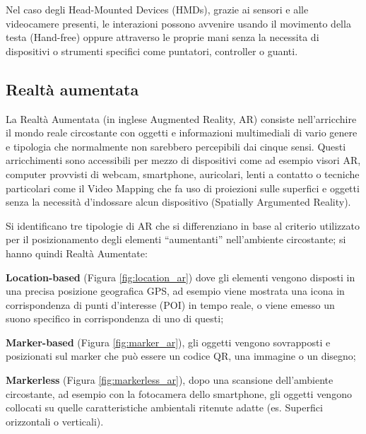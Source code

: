 Nel caso degli Head-Mounted Devices (HMDs), grazie ai sensori e alle videocamere presenti, le interazioni possono avvenire usando il movimento della testa (Hand-free) oppure attraverso le proprie mani senza la necessita di dispositivi o strumenti specifici come puntatori, controller o guanti.

\subsection{Realtà aumentata}
La Realtà Aumentata (in inglese Augmented Reality, AR) consiste nell'arricchire il mondo reale circostante con oggetti e informazioni multimediali di vario genere e tipologia che normalmente non sarebbero percepibili dai cinque sensi.
Questi arricchimenti sono accessibili per mezzo di dispositivi come ad esempio visori AR, computer provvisti di webcam, smartphone, auricolari, lenti a contatto o tecniche particolari come il Video Mapping che fa uso di proiezioni sulle superfici e oggetti senza la necessità d'indossare alcun dispositivo (Spatially Argumented Reality\cite{Raskar1999SpatiallyAR}).

Si identificano tre tipologie di AR che si differenziano in base al criterio utilizzato per il posizionamento degli elementi \enquote{aumentanti} nell'ambiente circostante; si hanno quindi Realtà Aumentate:

\begin{description}
    \item \textbf{Location-based} (Figura \ref{fig:location_ar}) dove gli elementi vengono disposti in una precisa posizione geografica GPS, ad esempio viene mostrata una icona in corrispondenza di punti d'interesse (POI) in tempo reale, o viene emesso un suono specifico in corrispondenza di uno di questi;
    \item \textbf{Marker-based} (Figura \ref{fig:marker_ar}), gli oggetti vengono sovrapposti e posizionati sul marker che può essere un codice QR, una immagine o un disegno;
    \item \textbf{Markerless} (Figura \ref{fig:markerless_ar}), dopo una scansione dell'ambiente circostante, ad esempio con la fotocamera dello smartphone, gli oggetti vengono collocati su quelle caratteristiche ambientali ritenute adatte (es. Superfici orizzontali o verticali).
\end{description}

